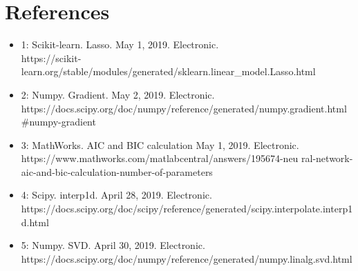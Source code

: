 \documentclass[12pt]{article}
\begin{document}
	\section{References}
	\begin{itemize}
		\item 1: Scikit-learn. Lasso. May 1, 2019. Electronic.\\  https://scikit-learn.org/stable/modules/generated/sklearn.linear\_model.Lasso.html
		\item 2: Numpy. Gradient. May 2, 2019. Electronic.\\  https://docs.scipy.org/doc/numpy/reference/generated/numpy.gradient.html\#numpy-gradient
		\item 3: MathWorks. AIC and BIC calculation May 1, 2019. Electronic. \\
		 https://www.mathworks.com/matlabcentral/answers/195674-neu
		 ral-network-aic-and-bic-calculation-number-of-parameters
		 \item 4: Scipy. interp1d. April 28, 2019. Electronic.\\ 
		https://docs.scipy.org/doc/scipy/reference/generated/scipy.interpolate.interp1d.html
		\item 5: Numpy. SVD. April 30, 2019. Electronic.\\ https://docs.scipy.org/doc/numpy/reference/generated/numpy.linalg.svd.html
	\end{itemize}
\end{document}
